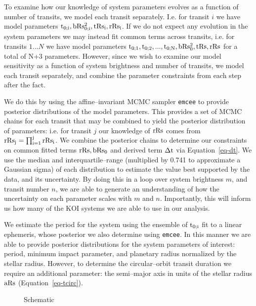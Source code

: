 \documentclass[prd, nofootinbib, floatfix, tightenlines, times]{article}
\begin{document}
To examine how our knowledge of system parameters evolves as a
function of number of transits, we model each transit separately.
I.e. for transit $i$ we have model parameters ${\rm t_{0;i},
  bRs_{0;i}^2, tRs_i, rRs_i}$.  If we do not expect any evolution in
the system parameters we may instead fit common terms across transits,
i.e. for transits $1...N$ we have model parameters ${\rm t_{0;1},
  t_{0;2}, ..., t_{0;N}, bRs_0^2, tRs, rRs}$ for a total of N+3
parameters.  However, since we wish to examine our model sensitivity
as a function of system brightness and number of transits, we model
each transit separately, and combine the parameter constraints from
each step after the fact.

We do this by using the affine--invariant MCMC sampler {\tt emcee}
\citep{2013PASP..125..306F} to provide posterior distributions of the
model parameters.  This provides a set of MCMC chains for each transit
that may be combined to yield the posterior distribution of
parameters: i.e. for transit $j$ our knowledge of ${\rm rRs}$ comes
from ${\rm rRs_j = \prod_{i=1}^j rRs_i}$.  We combine the posterior
chains to determine our constraints on common fitted terms ${\rm rRs,
  bRs_0}$ and derived term ${\rm \Delta t}$ via Equation~\ref{eq-dt}.
We use the median and interquartile--range (multiplied by 0.741 to
approximate a Gaussian sigma) of each distribution to estimate the
value best supported by the data, and its uncertainty.  By doing this
in a loop over system brightness $m$, and transit number $n$, we are
able to generate an understanding of how the uncertainty on each
parameter scales with $m$ and $n$.  Importantly, this will inform us
how many of the KOI systems we are able to use in our analysis.

We estimate the period for the system using the ensemble of ${\rm
  t_{0;i}}$ fit to a linear ephemeris, whose posterior we also
determine using {\tt emcee}.  In this manner we are able to provide
posterior distributions for the system parameters of interest: period,
minimum impact parameter, and planetary radius normalized by the
stellar radius.  However, to determine the circular--orbit transit
duration we require an additional parameter: the semi--major axis in
units of the stellar radius ${\rm aRs}$ (Equation~\ref{eq-tcirc}).

\begin{figure*}[t] 
\begin{center} 
\caption{Schematic}
\label{fig-schem} 
\end{center} 
\end{figure*}




\end{document}
